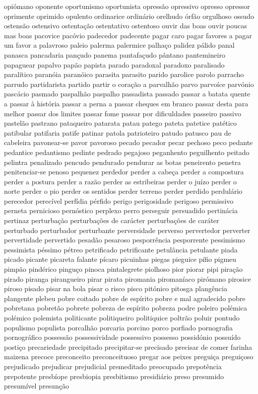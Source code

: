 \begin{appendices}
opi\'{o}mano oponente oportunismo oportunista opress\~ao opressivo opresso opressor oprimente oprimido opulento ordinarice ordin\'{a}rio orelhudo \'{o}rf\~ao orgulhoso ossudo ostens\~ao ostensivo ostenta\c{c}\~ao ostentativo ostentoso ouvir das boas ouvir poucas mas boas pacovice pac\'{o}vio padecedor padecente pagar caro pagar favores a pagar um favor a palavroso paleio palerma palermice palha\c{c}o palidez p\'{a}lido panal panasca pancadaria pan\c{c}udo panema pantafa\c{c}udo p\^{a}ntano pantemineiro papaguear papalvo pap\~ao papista parado paradoxal paradoxo paralisado paral\'{i}tico paran\'{o}ia paran\'{o}ico parasita parasito parido parolice parolo parracho parrudo partidarista partido partir o cora\c{c}\~ao a parvalh\~ao parvo parvo\'{i}ce parv\'{o}nio pasc\'{a}cio pasmado paspalh\~ao paspalho passadista passado passar a batata quente a passar \`{a} hist\'{o}ria passar a perna a passar cheques em branco passar desta para melhor passar dos limites passar fome passar por dificuldades passeiro passivo pastel\~ao pastrano pataqueiro patarata patau patego pateta patetice pat\'{e}tico patibular patifaria patife patinar patola patrioteiro patudo patusco pau de cabeleira pavonear-se pavor pavoroso pecado pecador pecar pechoso peco pedante pedantice pedantismo pedinte pedrado pegajoso peganhento peguilhento peitado pelintra penalizado pencudo pendurado pendurar as botas peneirento penetra penitenciar-se penoso pequenez perdedor perder a cabe\c{c}a perder a compostura perder a postura perder a raz\~ao perder as estribeiras perder o ju\'{i}zo perder o norte perder o pio perder os sentidos perder terreno perder perdido perdul\'{a}rio perecedor perec\'{i}vel perf\'{i}dia p\'{e}rfido perigo perigosidade perigoso permissivo perneta pernicioso pern\'{o}stico perplexo perro perseguir persuadido pertin\'{a}cia pertinaz perturba\c{c}\~ao perturba\c{c}\~oes de car\'{a}cter perturba\c{c}\~oes de car\'{a}ter perturbado perturbador perturbante perversidade perverso pervertedor perverter pervertidade pervertido pesad\~ao pesaroso pesporr\^{e}ncia pesporrente pessimismo pessimista p\'{e}ssimo p\'{e}treo petrificado petrificante petul\^{a}ncia petulante piada picado picante picareta falante p\'{i}caro picuinhas piegas pieguice p\'{i}fio pigmeu pimp\~ao pind\'{e}rico pingu\c{c}o pinoca pintalegrete piolhoso pior piorar pipi pira\c{c}\~ao pirado piranga pirangueiro pirar pirata piromania piroman\'{i}aco pir\'{o}mano pirosice piroso pisado pisar na bola pisar o risco pisco pit\'{o}nico pitosga plang\^{e}ncia plangente plebeu pobre coitado pobre de esp\'{i}rito pobre e mal agradecido pobre pobretana pobret\~ao pobrete pobreza de esp\'{i}rito pobreza podre poleiro pol\'{e}mica pol\'{e}mico polemista politicante politiqueiro politiquice poltr\~ao poluir pontudo populismo populista porcalh\~ao porcaria porcino porco porfiado pornografia pornogr\'{a}fico possess\~ao possessividade possessivo possesso possid\'{o}nio possu\'{i}do posti\c{c}o precariedade precipitado precipitar-se precisado precisar de comer farinha maizena precoce preconceito preconceituoso pregar aos peixes pregui\c{c}a pregui\c{c}oso prejudicado prejudicar prejudicial premeditado preocupado prepot\^{e}ncia prepotente presb\'{i}ope presbiopia presbitismo presidi\'{a}rio preso presumido presum\'{i}vel presun\c{c}\~ao 
\end{appendices}
